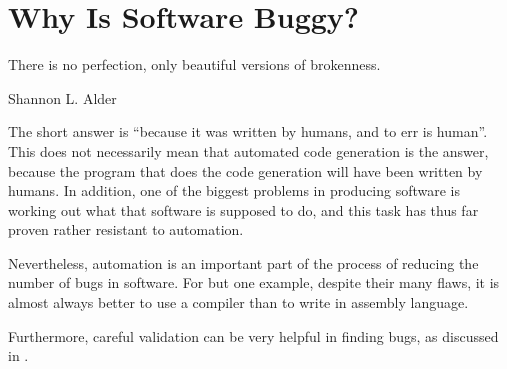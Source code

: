 
\section{Why Is Software Buggy?}
\label{sec:app:questions:Why Is Software Buggy?}
%
\epigraph{There is no perfection, only beautiful versions of brokenness.}
	 {Shannon L. Alder}

The short answer is ``because it was written by humans, and to err
is human''.
This does not necessarily mean that automated code generation is
the answer, because the program that does the code generation will
have been written by humans.
In addition, one of the biggest problems in producing software is
working out what that software is supposed to do, and this task
has thus far proven rather resistant to automation.

Nevertheless, automation is an important part of the process of reducing
the number of bugs in software.
For but one example, despite their many flaws, it is almost always better
to use a compiler than to write in assembly language.

Furthermore, careful validation can be very helpful in finding bugs,
as discussed in
.
